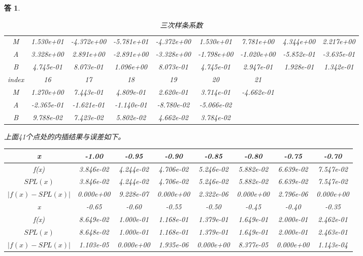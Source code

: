 \documentclass[10pt]{ctexart}
\newtheorem*{answer}{答}
\begin{document}
\begin{answer}
\begin{table}[H]
\begin{tabular}{ccccccccc}
            \midrule
            M & 1.530e+01 & -4.372e+00 & -5.781e+01 & -4.372e+00 & 1.530e+01 & 7.781e+00 & 4.344e+00 & 2.217e+00\\
            A & 3.328e+00 & 2.891e+00 & -2.891e+00 & -3.328e+00 & -1.798e+00 & -1.020e+00 & -5.852e-01 & -3.635e-01\\
            B & 4.745e-01 & 8.073e-01 & 1.096e+00 & 8.073e-01 & 4.745e-01 & 2.947e-01 & 1.928e-01 & 1.342e-01\\
            \bottomrule
            \toprule
            index & 16 & 17 & 18 & 19 & 20 & 21 &  &  \\
            \midrule
            M & 1.270e+00 & 7.443e-01 & 4.809e-01 & 2.620e-01 & 3.714e-01 & -4.662e-01 & & \\
            A & -2.365e-01 & -1.621e-01 & -1.140e-01 & -8.780e-02 & -5.066e-02 & & & \\
            B & 9.788e-02 & 7.423e-02 & 5.802e-02 & 4.662e-02 & 3.784e-02 & & &\\
            \bottomrule
        \end{tabular}
        \caption{三次样条系数}
    \end{table}
    上面41个点处的内插结果与误差如下。
    \begin{table}[H]
        \centering
        \begin{tabular}{cccccccc}
            \toprule
            x & -1.00 & -0.95 & -0.90 & -0.85 & -0.80 & -0.75 & -0.70 \\
            \midrule
            f(x) & 3.846e-02 & 4.244e-02 & 4.706e-02 & 5.246e-02 & 5.882e-02 & 6.639e-02 & 7.547e-02\\
            $SPL(x)$ & 3.846e-02 &  4.244e-02 & 4.706e-02 & 5.246e-02 & 5.882e-02 & 6.639e-02 & 7.547e-02\\
            $\lvert f(x)-SPL(x)\rvert$ & 0.000e+00 & 9.228e-07 & 0.000e+00 &  2.322e-06 & 0.000e+00 &2.796e-06 & 0.000e+00\\
            \bottomrule
            \toprule
            x & -0.65 & -0.60 & -0.55 & -0.50 & -0.45 & -0.40 & -0.35 \\
            \midrule
            f(x) & 8.649e-02 & 1.000e-01 & 1.168e-01 & 1.379e-01 & 1.649e-01 & 2.000e-01 & 2.462e-01 \\
            $SPL(x)$ & 8.648e-02 & 1.000e-01 & 1.168e-01 & 1.379e-01 & 1.649e-01 & 2.000e-01 & 2.463e-01  \\
            $\lvert f(x)-SPL(x)\rvert$ & 1.103e-05 & 0.000e+00 &  1.935e-06 & 0.000e+00 & 8.377e-05 &0.000e+00 & 1.143e-04 \\

\end{tabular}
\end{table}
\end{answer}
\end{document}
